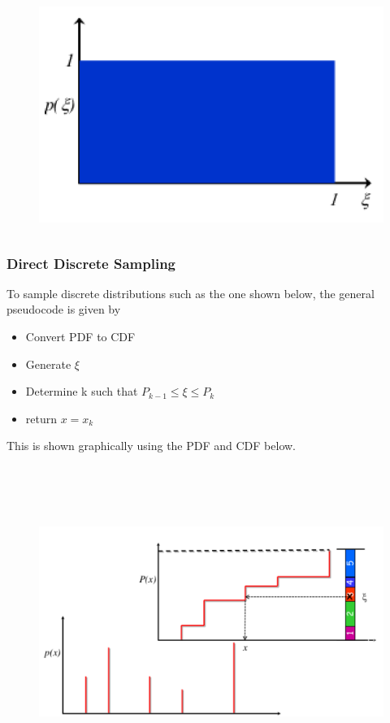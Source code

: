 \documentclass[12pt]{article}
\begin{document}
\begin{figure}
  \begin{center}
  \includegraphics[height=3in,clip]{../figs/unif-dist-var.png}
  \end{center}
\end{figure}

\subsubsection*{Direct Discrete Sampling}

To sample discrete distributions such as the one shown below, the general pseudocode is given by

\begin{itemize}
  \item Convert PDF to CDF
  \item Generate $\xi$
  \item Determine k such that $P_{k-1} \le \xi \le P_k$
  \item return $x = x_k$ 
\end{itemize}

This is shown graphically using the PDF and CDF below.

\begin{figure}
  \begin{center}
  \includegraphics[height=4.0in,clip]{../figs/disc-cdf.png}
  \end{center}
\end{figure}
\end{document}
